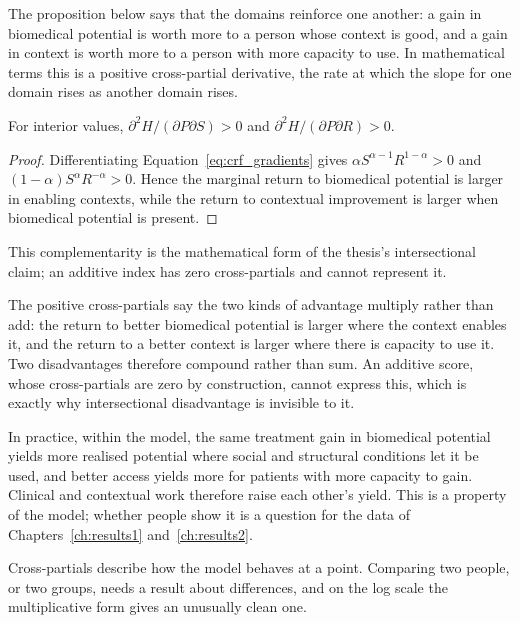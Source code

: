 The proposition below says that the domains reinforce one another: a gain in
biomedical potential is worth more to a person whose context is good, and a
gain in context is worth more to a person with more capacity to use. In
mathematical terms this is a positive cross-partial derivative, the rate at
which the slope for one domain rises as another domain rises.

\begin{proposition}
For interior values, $\partial^2H/(\partial P\partial S)>0$ and
$\partial^2H/(\partial P\partial R)>0$.
\end{proposition}
\begin{proof}
Differentiating Equation~\eqref{eq:crf_gradients} gives
$\alpha S^{\alpha-1}R^{1-\alpha}>0$ and
$(1-\alpha)S^{\alpha}R^{-\alpha}>0$. Hence the marginal return to biomedical
potential is larger in enabling contexts, while the return to contextual
improvement is larger when biomedical potential is present.
\end{proof}
This complementarity is the mathematical form of the thesis's intersectional \citep{crenshaw_1991,bowleg_2008}
claim; an additive index has zero cross-partials and cannot represent it.

\begin{reading}
The positive cross-partials say the two kinds of advantage multiply rather than add:
the return to better biomedical potential is larger where the context enables it,
and the return to a better context is larger where there is capacity to use it. Two
disadvantages therefore compound rather than sum. An additive score, whose
cross-partials are zero by construction, cannot express this, which is exactly why
intersectional disadvantage is invisible to it.

In practice, within the model, the same treatment gain in biomedical potential
yields more realised potential where social and structural conditions let it be
used, and better access yields more for patients with more capacity to gain.
Clinical and contextual work therefore raise each other's yield. This is a
property of the model; whether people show it is a question for the data of
Chapters~\ref{ch:results1} and~\ref{ch:results2}.
\end{reading}

Cross-partials describe how the model behaves at a point. Comparing two people,
or two groups, needs a result about differences, and on the log scale the
multiplicative form gives an unusually clean one.

